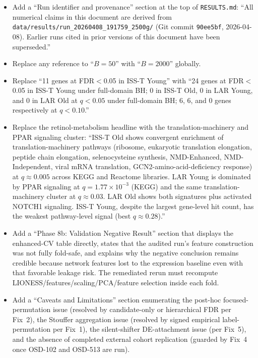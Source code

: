 \documentclass[11pt]{article}
\newcommand{\code}[1]{\texttt{#1}}
\begin{document}
\begin{itemize}[leftmargin=*]
\item Add a ``Run identifier and provenance'' section at the top of \code{RESULTS.md}: ``All numerical claims in this document are derived from \code{data/results/run\_20260408\_191759\_2500g/} (Git commit \code{90ee5bf}, 2026-04-08). Earlier runs cited in prior versions of this document have been superseded.''
\item Replace any reference to ``$B{=}50$'' with ``$B{=}2000$'' globally.
\item Replace ``11 genes at FDR$<$0.05 in ISS-T Young'' with ``24 genes at FDR$<$0.05 in ISS-T Young under full-domain BH; 0 in ISS-T Old, 0 in LAR Young, and 0 in LAR Old at $q<0.05$ under full-domain BH; 6, 6, and 0 genes respectively at $q<0.10$.''
\item Replace the retinol-metabolism headline with the translation-machinery and PPAR signaling cluster: ``ISS-T Old shows convergent enrichment of translation-machinery pathways (ribosome, eukaryotic translation elongation, peptide chain elongation, selenocysteine synthesis, NMD-Enhanced, NMD-Independent, viral mRNA translation, GCN2-amino-acid-deficiency response) at $q\approx 0.005$ across KEGG and Reactome libraries. LAR Young is dominated by PPAR signaling at $q=1.77\times 10^{-3}$ (KEGG) and the same translation-machinery cluster at $q\approx 0.03$. LAR Old shows both signatures plus activated NOTCH1 signaling. ISS-T Young, despite the largest gene-level hit count, has the weakest pathway-level signal (best $q\approx 0.28$).''
\item Add a ``Phase 8b: Validation Negative Result'' section that displays the enhanced-CV table directly, states that the audited run's feature construction was not fully fold-safe, and explains why the negative conclusion remains credible because network features lost to the expression baseline even with that favorable leakage risk. The remediated rerun must recompute LIONESS/features/scaling/PCA/feature selection inside each fold.
\item Add a ``Caveats and Limitations'' section enumerating the post-hoc focused-permutation issue (resolved by candidate-only or hierarchical FDR per Fix~2), the Stouffer aggregation issue (resolved by signed empirical label-permutation per Fix~1), the silent-shifter DE-attachment issue (per Fix~5), and the absence of completed external cohort replication (guarded by Fix~4 once OSD-102 and OSD-513 are run).
\end{itemize}
\end{document}
